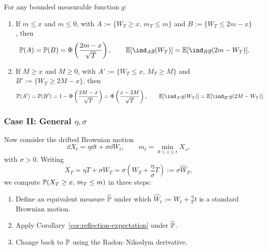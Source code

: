 \begin{corollary}\label{cor:reflection-expectation}
    For any bounded measurable function $g$:
    \begin{enumerate}
        \item If $m \le x$ and $m \le 0$, with $A := \{W_T \ge x,\, m_T \le m\}$ and $B := \{W_T \le 2m - x\}$, then
        \[
        \Prob(A) = \Prob(B) = \Phi\left(\frac{2m - x}{\sqrt{T}}\right), \qquad \E[\ind_A g(W_T)] = \E[\ind_B g(2m - W_T)].
        \]
        \item If $M \ge x$ and $M \ge 0$, with $A' := \{W_T \le x,\, M_T \ge M\}$ and $B' := \{W_T \ge 2M - x\}$, then
        \[
        \Prob(A') = \Prob(B') = 1 - \Phi\left(\frac{2M - x}{\sqrt{T}}\right) = \Phi\left(\frac{x - 2M}{\sqrt{T}}\right), \qquad \E[\ind_{A'} g(W_T)] = \E[\ind_{B'} g(2M - W_T)].
        \]
    \end{enumerate}
\end{corollary}

\subsubsection*{Case II: General $\eta, \sigma$}

Now consider the drifted Brownian motion
\[
\dd X_t = \eta \dd t + \sigma \dd W_t, \qquad m_t = \min_{0 \le s \le t} X_s,
\]
with $\sigma > 0$. Writing
\[
X_T = \eta T + \sigma W_T = \sigma\left(W_T + \frac{\eta}{\sigma}T\right) := \sigma \widehat{W}_T,
\]
we compute $\mathbb{P}(X_T \ge x,\, m_T \le m)$ in three steps:
\begin{enumerate}
    \item Define an equivalent measure $\widehat{\mathbb{P}}$ under which $\widehat{W}_t := W_t + \frac{\eta}{\sigma} t$ is a standard Brownian motion.
    \item Apply Corollary~\ref{cor:reflection-expectation} under $\widehat{\mathbb{P}}$.
    \item Change back to $\mathbb{P}$ using the Radon--Nikodym derivative.
\end{enumerate}

